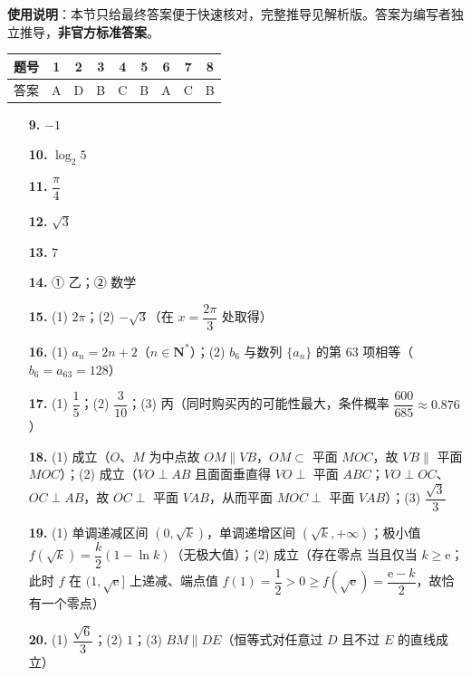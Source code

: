 
\begin{gknotice}
\textbf{使用说明}：本节只给最终答案便于快速核对，完整推导见解析版。答案为编写者独立推导，\textbf{非官方标准答案}。
\end{gknotice}

\begin{center}\begin{tabular}{ccccccccc}
\toprule
题号 & 1 & 2 & 3 & 4 & 5 & 6 & 7 & 8 \\
\midrule
答案 & A & D & B & C & B & A & C & B \\
\bottomrule
\end{tabular}\end{center}

\begin{itemize}[leftmargin=2.6em]
  \item[\textbf{9.}] \(-1\)
  \item[\textbf{10.}] \(\log_{2}5\)
  \item[\textbf{11.}] \(\dfrac{\pi}{4}\)
  \item[\textbf{12.}] \(\sqrt{3}\)
  \item[\textbf{13.}] \(7\)
  \item[\textbf{14.}] ① 乙；② 数学
\end{itemize}

\begin{itemize}[leftmargin=2.6em]
  \item[\textbf{15.}] (1) \(2\pi\)；(2) \(-\sqrt{3}\)（在 \(x=\dfrac{2\pi}{3}\) 处取得）
  \item[\textbf{16.}] (1) \(a_{n}=2n+2\)（\(n\in\mathbf{N}^{*}\)）；(2) \(b_{6}\) 与数列 \(\{a_{n}\}\) 的第 \(63\) 项相等（\(b_{6}=a_{63}=128\)）
  \item[\textbf{17.}] (1) \(\dfrac{1}{5}\)；(2) \(\dfrac{3}{10}\)；(3) 丙（同时购买丙的可能性最大，条件概率 \(\dfrac{600}{685}\approx 0.876\)）
  \item[\textbf{18.}] (1) 成立（\(O\)、\(M\) 为中点故 \(OM\parallel VB\)，\(OM\subset\) 平面 \(MOC\)，故 \(VB\parallel\) 平面 \(MOC\)）；(2) 成立（\(VO\perp AB\) 且面面垂直得 \(VO\perp\) 平面 \(ABC\)；\(VO\perp OC\)、\(OC\perp AB\)，故 \(OC\perp\) 平面 \(VAB\)，从而平面 \(MOC\perp\) 平面 \(VAB\)）；(3) \(\dfrac{\sqrt{3}}{3}\)
  \item[\textbf{19.}] (1) 单调递减区间 \(\left(0,\sqrt{k}\right)\)，单调递增区间 \(\left(\sqrt{k},+\infty\right)\)；极小值 \(f(\sqrt{k})=\dfrac{k}{2}(1-\ln k)\)（无极大值）；(2) 成立（存在零点 当且仅当 \(k\geqslant\mathrm{e}\)；此时 \(f\) 在 \((1,\sqrt{\mathrm{e}}]\) 上递减、端点值 \(f(1)=\dfrac{1}{2}>0\geqslant f(\sqrt{\mathrm{e}})=\dfrac{\mathrm{e}-k}{2}\)，故恰有一个零点）
  \item[\textbf{20.}] (1) \(\dfrac{\sqrt{6}}{3}\)；(2) \(1\)；(3) \(BM\parallel DE\)（恒等式对任意过 \(D\) 且不过 \(E\) 的直线成立）
\end{itemize}

